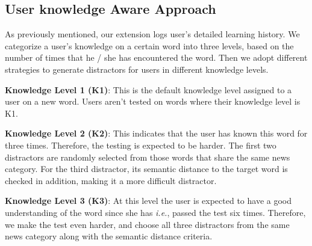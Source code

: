 \subsection{User knowledge Aware Approach}
As previously mentioned, our extension logs user's detailed learning history. We categorize a user's knowledge on a certain word into three levels, based on the number of times that he / she has encountered  the word. Then we adopt different strategies to generate distractors for users in different knowledge levels. 

{\bf Knowledge Level 1 (K1)}: This is the default knowledge level assigned to a user on a new word. Users aren't tested on words where their knowledge level is K1.

{\bf Knowledge Level 2 (K2)}: This indicates that the user has known this word for three times. Therefore, the testing is expected to be harder. The first two distractors are randomly selected from those words that share the same news category. For the third distractor, its semantic distance to the target word is checked in addition, making it a more difficult distractor.  

{\bf Knowledge Level 3 (K3)}: At this level the user is expected to have a good understanding of the word since she has {\it i.e.}, passed the test six times. Therefore, we make the test even harder, and choose  all three distractors from the same news category along with the semantic distance criteria. 


